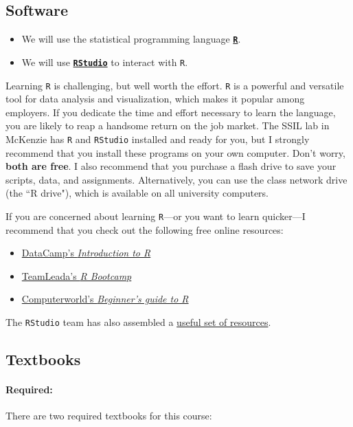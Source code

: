 \documentclass[10pt]{article}
\begin{document}
\newpage

\subsection*{Software}

\begin{itemize}
  \item We will use the statistical programming language \href{https://www.r-project.org/}{\textbf{\texttt{R}}}.
  \item We will use \href{https://www.rstudio.com}{\textbf{\texttt{RStudio}}} to interact with \texttt{R}.
\end{itemize}
Learning \texttt{R} is challenging, but well worth the effort. \texttt{R} is a powerful and versatile tool for data analysis and visualization, which makes it popular among employers. If you dedicate the time and effort necessary to learn the language, you are likely to reap a handsome return on the job market. The SSIL lab in McKenzie has \texttt{R} and \texttt{RStudio} installed and ready for you, but I strongly recommend that you install these programs on your own computer. Don't worry, \textbf{both are free}. I also recommend that you purchase a flash drive to save your scripts, data, and assignments. Alternatively, you can use the class network drive (the ``R drive"), which is available on all university computers.

If you are concerned about learning \texttt{R}---or you want to learn quicker---I recommend that you check out the following free online resources:
\begin{itemize}
  \item \href{https://www.datacamp.com/courses/free-introduction-to-r}{DataCamp's \textit{Introduction to R}}
  \item \href{https://www.teamleada.com/courses/r-bootcamp}{TeamLeada's \textit{R Bootcamp}}
  \item \href{https://www.computerworld.com/article/2497143/business-intelligence-beginner-s-guide-to-r-introduction.html}{Computerworld's \textit{Beginner's guide to R}}
\end{itemize}
The \texttt{RStudio} team has also assembled a \href{https://www.rstudio.com/online-learning/}{useful set of resources}.

\subsection*{Textbooks}

\paragraph{Required:} There are two required textbooks for this course:
\end{document}
